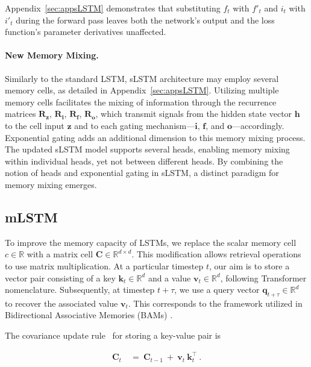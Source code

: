 Appendix~\ref{sec:appsLSTM} demonstrates that substituting $f_t$ with $f'_t$ and $i_t$ with $i'_t$ during the forward pass leaves both the network’s output and the loss function’s parameter derivatives unaffected.

\paragraph{New Memory Mixing.} Similarly to the standard LSTM, sLSTM architecture may employ several memory cells, as detailed in Appendix~\ref{sec:appsLSTM}. Utilizing multiple memory cells facilitates the mixing of information through the recurrence matrices $\mathbf{R}_{\mathbf{z}}$, $\mathbf{R}_{\mathbf{i}}$, $\mathbf{R}_{\mathbf{f}}$, $\mathbf{R}_{\mathbf{o}}$, which transmit signals from the hidden state vector $\mathbf{h}$ to the cell input $\mathbf{z}$ and to each gating mechanism—$\mathbf{i}$, $\mathbf{f}$, and $\mathbf{o}$—accordingly. Exponential gating adds an additional dimension to this memory mixing process. The updated sLSTM model supports several heads, enabling memory mixing within individual heads, yet not between different heads. By combining the notion of heads and exponential gating in sLSTM, a distinct paradigm for memory mixing emerges.

\subsection{mLSTM}
\label{sec:mLSTM}

To improve the memory capacity of LSTMs, we replace the scalar memory cell $c \in \mathbb{R}$ with a matrix cell $\mathbf{C} \in \mathbb{R}^{d \times d}$. This modification allows retrieval operations to use matrix multiplication. At a particular timestep $t$, our aim is to store a vector pair consisting of a key $\mathbf{k}_t \in \mathbb{R}^d$ and a value $\mathbf{v}_t \in \mathbb{R}^d$, following Transformer nomenclature. Subsequently, at timestep $t + \tau$, we use a query vector $\mathbf{q}_{t+\tau} \in \mathbb{R}^d$ to recover the associated value $\mathbf{v}_t$. This corresponds to the framework utilized in Bidirectional Associative Memories (BAMs) \citep{Kohonen:72,Anderson:72,Nakano:72,Anderson:77}.

The covariance update rule~\citep{Sejnowski:77,Dayan:91} for storing a key-value pair is

\begin{align}
\mathbf{C}_t \ &= \ \mathbf{C}_{t-1} \ + \ \mathbf{v}_{t} \ \mathbf{k}_t^\top \ .
\end{align}

